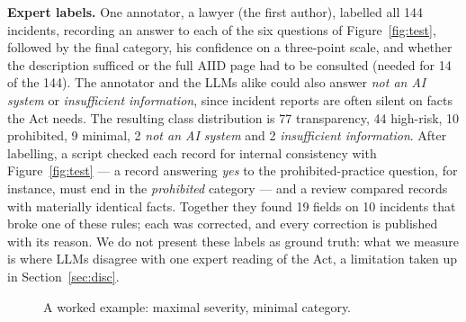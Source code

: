 \documentclass[sigconf,natbib=false, language=english]{acmart}
\begin{document}
\textbf{Expert labels.} One annotator, a lawyer (the first author), labelled all 144
incidents, recording an answer to each of the six questions of
Figure~\ref{fig:test}, followed by the final category, his confidence on a
three-point scale, and whether the description sufficed or the full AIID page had to
be consulted (needed for 14 of the 144). The annotator and the LLMs alike could also
answer \emph{not an AI system} or \emph{insufficient information}, since incident
reports are often silent on facts the Act needs. The resulting class distribution is
77 transparency, 44 high-risk, 10 prohibited, 9 minimal, 2 \emph{not an AI system}
and 2 \emph{insufficient information}. After labelling, a script checked each record
for internal consistency with Figure~\ref{fig:test} --- a record answering \emph{yes}
to the prohibited-practice question, for instance, must end in the \emph{prohibited}
category --- and a review compared records with materially identical facts. Together
they found 19 fields on 10 incidents that broke one of these rules; each was
corrected, and every correction is published with its reason. We do not present these
labels as ground truth: what we measure is where LLMs disagree with one expert reading
of the Act, a limitation taken up in Section~\ref{sec:disc}.

\begin{figure}[t]
  \centering
  \caption{A worked example: maximal severity, minimal category.}
  \label{fig:example}
\end{figure}
\end{document}
